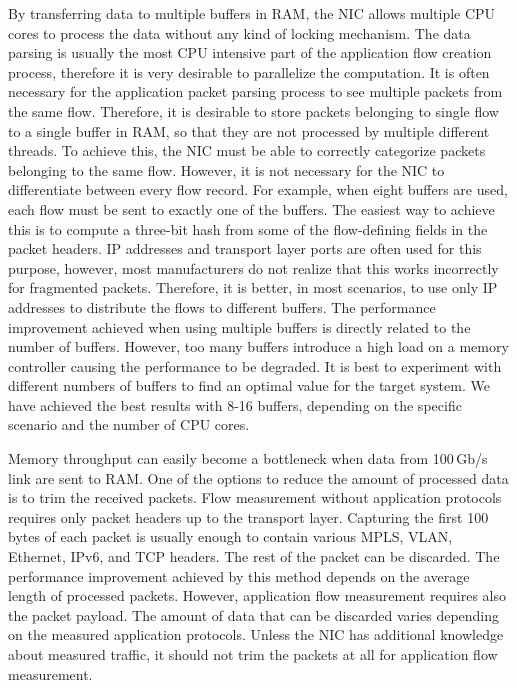 By transferring data to multiple buffers in RAM, the NIC allows multiple CPU cores to process the data without any kind of locking mechanism. The data parsing is usually the most CPU intensive part of the application flow creation process, therefore it is very desirable to parallelize the computation. It is often necessary for the application packet parsing process to see multiple packets from the same flow. Therefore, it is desirable to store packets belonging to single flow to a single buffer in RAM, so that they are not processed by multiple different threads. To achieve this, the NIC must be able to correctly categorize packets belonging to the same flow. However, it is not necessary for the NIC to differentiate between every flow record. For example, when eight buffers are used, each flow must be sent to exactly one of the buffers. The easiest way to achieve this is to compute a three-bit hash from some of the flow-defining fields in the packet headers. IP addresses and transport layer ports are often used for this purpose, however, most manufacturers do not realize that this works incorrectly for fragmented packets. Therefore, it is better, in most scenarios, to use only IP addresses to distribute the flows to different buffers. The performance improvement achieved when using multiple buffers is directly related to the number of buffers. However, too many buffers introduce a high load on a memory controller causing the performance to be degraded. It is best to experiment with different numbers of buffers to find an optimal value for the target system. We have achieved the best results with 8-16 buffers, depending on the specific scenario and the number of CPU cores.

Memory throughput can easily become a bottleneck when data from 100\,Gb/s link are sent to RAM. One of the options to reduce the amount of processed data is to trim the received packets. Flow measurement without application protocols requires only packet headers up to the transport layer. Capturing the first 100 bytes of each packet is usually enough to contain various MPLS, VLAN, Ethernet, IPv6, and TCP headers. The rest of the packet can be discarded. The performance improvement achieved by this method depends on the average length of processed packets. However, application flow measurement requires also the packet payload. The amount of data that can be discarded varies depending on the measured application protocols. Unless the NIC has additional knowledge about measured traffic, it should not trim the packets at all for application flow measurement.


